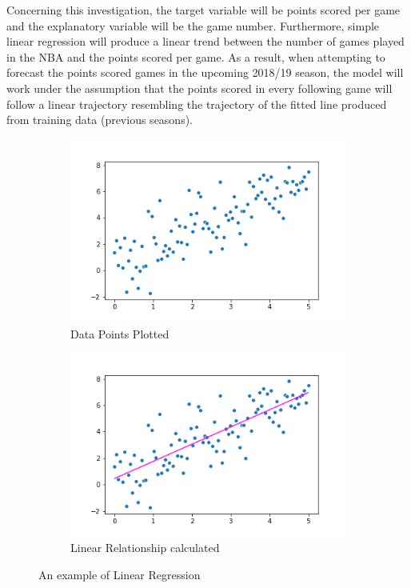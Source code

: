 \documentclass[a4paper,11pt,twoside]{article}
\begin{document}
Concerning this investigation, the target variable will be points scored per game and the explanatory variable will be the game number. Furthermore, simple linear regression will produce a linear trend between the number of games played in the NBA and the points scored per game. As a result, when attempting to forecast the points scored games in the upcoming 2018/19 season, the model will work under the assumption that the points scored in every following game will follow a linear trajectory resembling the trajectory of the fitted line produced from training data (previous seasons).

\begin{figure} [h!]
  \centering
  \begin{subfigure}[b]{0.4\textwidth}
    \includegraphics[width=\textwidth]{scatterplt_ex.png}
    \caption{Data Points Plotted}
    \label{fig:1}
  \end{subfigure}
  \begin{subfigure}[b]{0.4\textwidth}
    \includegraphics[width=\textwidth]{linregscatterplt.png}
    \caption{Linear Relationship calculated}
    \label{fig:2}
  \end{subfigure}
  \caption{An example of Linear Regression}
  \label{fig:3}
\end{figure}
\end{document}

